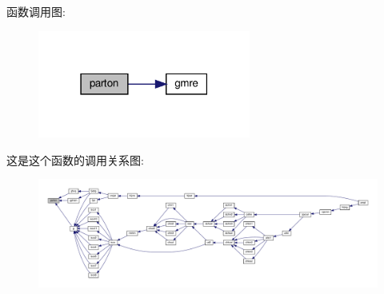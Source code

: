 函数调用图\+:
\nopagebreak
\begin{figure}[H]
\begin{center}
\leavevmode
\includegraphics[width=198pt]{parton_8f90_a3b6487bad48aa8ef534f4d1b31eff181_cgraph}
\end{center}
\end{figure}
这是这个函数的调用关系图\+:
\nopagebreak
\begin{figure}[H]
\begin{center}
\leavevmode
\includegraphics[width=350pt]{parton_8f90_a3b6487bad48aa8ef534f4d1b31eff181_icgraph}
\end{center}
\end{figure}
